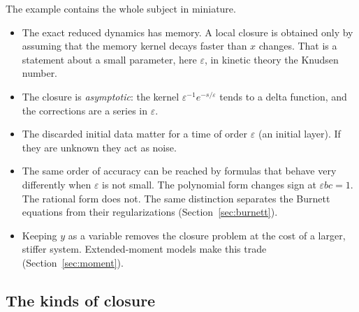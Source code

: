 The example contains the whole subject in miniature.
\begin{itemize}
  \item The exact reduced dynamics has memory. A local closure is obtained
    only by assuming that the memory kernel decays faster than $x$ changes.
    That is a statement about a small parameter, here $\varepsilon$, in
    kinetic theory the Knudsen number.
  \item The closure is \emph{asymptotic}: the kernel
    $\varepsilon^{-1}e^{-s/\varepsilon}$ tends to a delta function, and the
    corrections are a series in $\varepsilon$.
  \item The discarded initial data matter for a time of order $\varepsilon$
    (an initial layer). If they are unknown they act as noise.
  \item The same order of accuracy can be reached by formulas that behave
    very differently when $\varepsilon$ is not small. The polynomial form
    changes sign at $\varepsilon bc = 1$. The rational form does not. The
    same distinction separates the Burnett equations from their
    regularizations (Section~\ref{sec:burnett}).
  \item Keeping $y$ as a variable removes the closure problem at the cost of
    a larger, stiffer system. Extended-moment models make this trade
    (Section~\ref{sec:moment}).
\end{itemize}

\subsection{The kinds of closure}
\label{sec:kinds}


